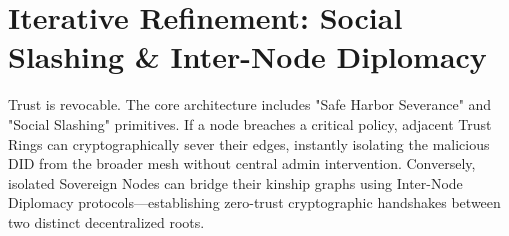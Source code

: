\section{Iterative Refinement: Social Slashing \& Inter-Node Diplomacy}
Trust is revocable. The core architecture includes "Safe Harbor Severance" and "Social Slashing" primitives. If a node breaches a critical policy, adjacent Trust Rings can cryptographically sever their edges, instantly isolating the malicious DID from the broader mesh without central admin intervention. Conversely, isolated Sovereign Nodes can bridge their kinship graphs using Inter-Node Diplomacy protocols—establishing zero-trust cryptographic handshakes between two distinct decentralized roots.
